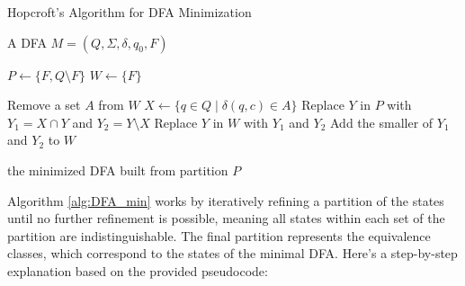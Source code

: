 \begin{algorithm}
    \caption{Hopcroft's Algorithm for DFA Minimization} \label{alg:DFA_min}
    \begin{algorithmic}[1]
    \Require A DFA $M = (Q, \Sigma, \delta, q_0, F)$
    
    \State $P \gets \{F, Q \setminus F\}$ 
    \State $W \gets \{F\}$ 
    
        \State Remove a set $A$ from $W$
            \State $X \gets \{q \in Q \mid \delta(q, c) \in A\}$ 
                \State Replace $Y$ in $P$ with $Y_1 = X \cap Y$ and $Y_2 = Y \setminus X$
                    \State Replace $Y$ in $W$ with $Y_1$ and $Y_2$
                \Else
                    \State Add the smaller of $Y_1$ and $Y_2$ to $W$
                \EndIf
            \EndFor
        \EndFor
    \EndWhile
    
    \State \Return the minimized DFA built from partition $P$
    \end{algorithmic}
\end{algorithm}

Algorithm \ref{alg:DFA_min} works by iteratively refining a partition of the states until no further refinement is possible, meaning all states within each set of the partition are indistinguishable. The final partition represents the equivalence classes, which correspond to the states of the minimal DFA. Here's a step-by-step explanation based on the provided pseudocode:

